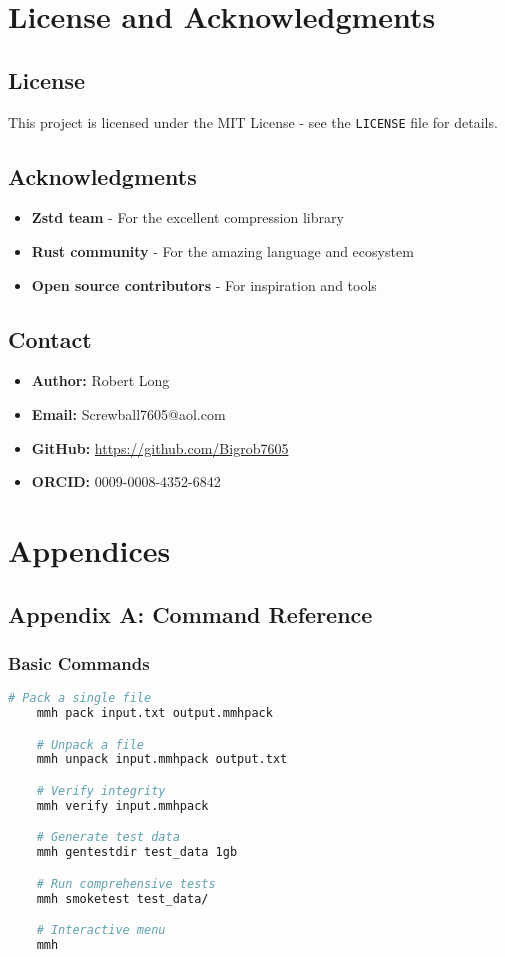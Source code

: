 \documentclass[11pt,a4paper]{article}
\begin{document}
	\section{License and Acknowledgments}
	\label{sec:license}

	\subsection{License}
	This project is licensed under the MIT License - see the \texttt{LICENSE} file for details.

	\subsection{Acknowledgments}
	\begin{itemize}
		\item \textbf{Zstd team} - For the excellent compression library
		\item \textbf{Rust community} - For the amazing language and ecosystem
		\item \textbf{Open source contributors} - For inspiration and tools
	\end{itemize}

	\subsection{Contact}
	\begin{itemize}
		\item \textbf{Author:} Robert Long
		\item \textbf{Email:} Screwball7605@aol.com
		\item \textbf{GitHub:} \url{https://github.com/Bigrob7605}
		\item \textbf{ORCID:} 0009-0008-4352-6842
	\end{itemize}

	\section{Appendices}
	\label{sec:appendices}

	\subsection{Appendix A: Command Reference}

	\subsubsection{Basic Commands}
	\begin{lstlisting}[language=bash]
	# Pack a single file
	mmh pack input.txt output.mmhpack

	# Unpack a file
	mmh unpack input.mmhpack output.txt

	# Verify integrity
	mmh verify input.mmhpack

	# Generate test data
	mmh gentestdir test_data 1gb

	# Run comprehensive tests
	mmh smoketest test_data/

	# Interactive menu
	mmh
	\end{lstlisting}
\end{document}
